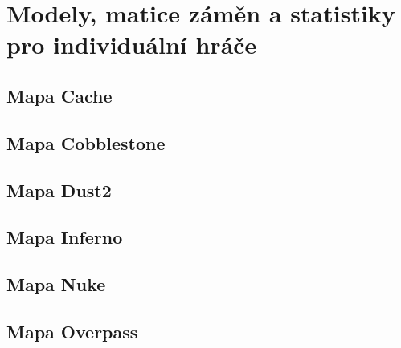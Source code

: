 \chapter{Modely, matice záměn a statistiky pro individuální hráče} \label{chap:ap02}
\section{Mapa Cache}



\newpage

\section{Mapa Cobblestone}



\newpage

\section{Mapa Dust2}



\newpage

\section{Mapa Inferno}



\newpage

% 
% 
% 

\section{Mapa Nuke}



\newpage

\section{Mapa Overpass}



\newpage

